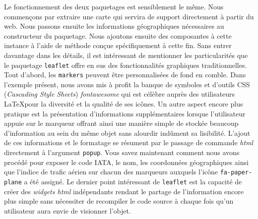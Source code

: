 \vspace{\baselineskip}
Le fonctionnement des deux paquetages est sensiblement le même. Nous commençons par extraire une carte qui servira de support directement à partir du web. Nous passons ensuite les informations géographiques nécessaires au constructeur du paquetage. Nous ajoutons ensuite des composantes à cette instance à l'aide de méthode conçue spécifiquement à cette fin. Sans entrer davantage dans les détails, il est intéressant de mentionner les particularités que le paquetage \texttt{leaflet} offre en sus des fonctionnalités graphiques traditionnelles. \\

Tout d'abord, les \texttt{markers} peuvent être personnalisées de fond en comble. Dans l'exemple présent, nous avons mis à profit la banque de symboles et d'outils CSS (\emph{Cascading Style Sheets}) \emph{fontawesome} \cite{fontAwesome} qui est célèbre auprès des utilisateurs \LaTeX pour la diversité et la qualité de ses icônes. Un autre aspect encore plus pratique est la présentation d'informations supplémentaires lorsque l'utilisateur appuie sur le marqueur offrant ainsi une manière simple de stockée beaucoup d'information au sein du même objet sans alourdir indûment sa lisibilité. L'ajout de ces informations et le formatage se résument par le passage de commande \emph{html} directement à l'argument \texttt{popup}. Vous savez maintenant comment nous avons procédé pour exposer le code IATA, le nom, les coordonnées géographiques ainsi que l'indice de trafic aérien sur chacun des marqueurs auxquels l'icône \texttt{fa-paper-plane} a été assigné. Le dernier point intéressant de \texttt{leaflet} est la capacité de créer des \emph{widgets html} indépendants rendant le partage de l'information encore plus simple sans nécessiter de recompiler le code source à chaque fois qu'un utilisateur aura envie de visionner l'objet. \cite{leaflet} \\

